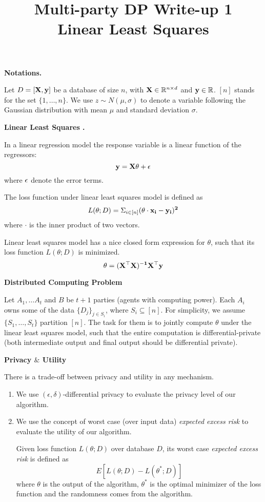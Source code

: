 \documentclass[11pt]{article}
\title{Multi-party DP Write-up 1\\
Linear Least Squares}
\date{}
\begin{document}
\maketitle

{\bf Notations.}

Let $D={\bf [X, y]}$ be a database of size $n$, with ${\bf X} \in \mathbb{R}^{n \times d}$ and ${\bf y} \in \mathbb{R}$. $[n]$ stands for the set $\{1, \dots, n\}$. We use $z \sim N(\mu, \sigma)$ to denote a variable following the Gaussian distribution with mean $\mu$ and standard deviation $\sigma$.

{\bf Linear Least Squares .}

In a linear regression model the response variable is a linear function of the regressors:
\begin{equation}
{\bf y = X\theta + \epsilon}
\end{equation}
where $\bf \epsilon$ denote the error terms. 

The loss function under linear least squares model is defined as 
\begin{equation}
L(\theta; D) = \Sigma_{i \in [n]} (\bf {\theta \cdot x_{i}}  - y_{i})^{2}
\end{equation}
where $\cdot$ is the inner product of two vectors.

Linear least squares model has a nice closed form expression for $\theta$, such that its loss function $L(\theta;D)$ is minimized.
\begin{equation}
{\bf \theta = (X^{\top} X)^{-1} X^{\top} y }
\end{equation}

{\bf Distributed Computing Problem}

Let $A_{1}, \dots A_{t}$ and $B$ be $t+1$ parties (agents with computing power). Each $A_{i}$ owns some of the data $\{D_{j}\}_{j \in S_{i}}$, where $S_{i} \subseteq [n]$. For simplicity, we assume $\{S_{1}, \dots , S_{t}\}$ partition $[n]$. The task for them is to jointly compute $\theta$ under the linear least squares model, such that the entire computation is differential-private (both intermediate output and final output should be differential private).

{\bf Privacy $\&$ Utility}

There is a trade-off between privacy and utility in any mechanism. 
\begin{enumerate}
\item We use $(\epsilon, \delta)$-differential privacy to evaluate the privacy level of our algorithm.
\item We use the concept of worst case (over input data) {\it expected excess risk} to evaluate the utility of our algorithm. 
\begin{definition}
Given loss function $L(\theta; D)$ over database $D$, its worst case {\it expected excess risk} is defined as
\begin{equation}
E[L(\theta; D) - L(\theta^{*}; D)]
\end{equation}
where $\theta$ is the output of the algorithm, $\theta^{*}$ is the optimal minimizer of the loss function and the randomness comes from the algorithm.
\end{definition}
\end{enumerate}
\end{document}
